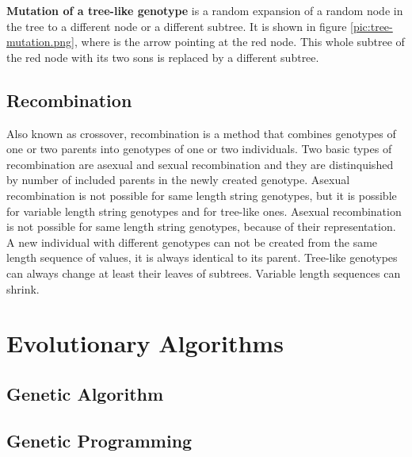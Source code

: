 \textbf{Mutation of a tree-like genotype} is a random expansion of a random node in the tree to a different node or a different subtree. It is shown in figure \ref{pic:tree-mutation.png}, where is the arrow pointing at the red node. This whole subtree of the red node with its two sons is replaced by a different subtree.


\subsection{Recombination}
Also known as crossover, recombination is a method that combines genotypes of one or two parents into genotypes of one or two individuals. Two basic types of recombination are asexual and sexual recombination and they are distinquished by number of included parents in the newly created genotype. Asexual recombination is not possible for same length string genotypes, but it is possible for variable length string genotypes and for tree-like ones. Asexual recombination is not possible for same length string genotypes, because of their representation. A new individual with different genotypes can not be created from the same length sequence of values, it is always identical to its parent. Tree-like genotypes can always change at least their leaves of subtrees. Variable length sequences can shrink.

\section{Evolutionary Algorithms}
\blindtext
\subsection{Genetic Algorithm}
\blindtext
\blindtext
\subsection{Genetic Programming}
\blindtext
\blindtext
